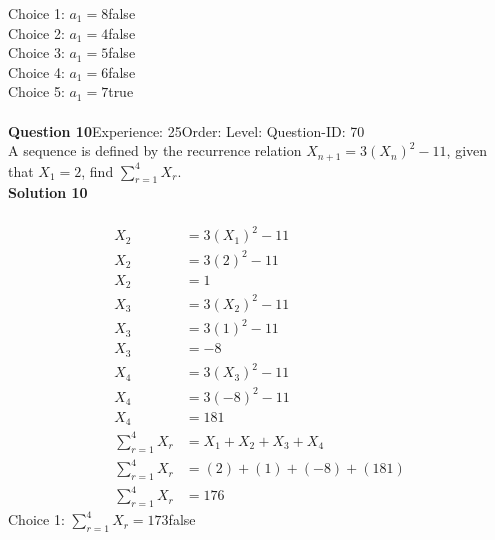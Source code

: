 \documentclass{article}
\begin{document}
Choice 1: \hspace{20pt}$a_1=8$\hspace{20pt}false\\
Choice 2: \hspace{20pt}$a_1=4$\hspace{20pt}false\\
Choice 3: \hspace{20pt}$a_1=5$\hspace{20pt}false\\
Choice 4: \hspace{20pt}$a_1=6$\hspace{20pt}false\\
Choice 5: \hspace{20pt}$a_1=7$\hspace{20pt}true\\
\\[4pt]
\noindent\textbf{Question 10}\hspace{20pt}Experience: 25\hspace{20pt}Order: \hspace{20pt}Level: \hspace{20pt}Question-ID: 70\\[2pt]
A sequence is defined by the recurrence relation $X_{n+1}=3(X_n)^2-11$, given that  $X_1 =2$, find $\displaystyle\sum_{r=1}^{4} X_r$.\\[4pt]
\noindent\textbf{Solution 10}\\[2pt]
\\[-35pt]\begin{align*}
X_2&=3(X_1)^2-11\\[2pt]
X_2&=3(2)^2-11\\[2pt]
X_2&=1\\[12pt]
X_3&=3(X_2)^2-11\\[2pt]
X_3&=3(1)^2-11\\[2pt]
X_3&=-8\\[12pt]
X_4&=3(X_3)^2-11\\[2pt]
X_4&=3(-8)^2-11\\[2pt]
X_4&=181\\[12pt]
\displaystyle\sum_{r=1}^{4} X_r&=X_1+X_2+X_3+X_4\\[2pt]
\displaystyle\sum_{r=1}^{4} X_r&=(2)+(1)+(-8)+(181)\\[2pt]
\displaystyle\sum_{r=1}^{4} X_r&=176
\end{align*}
Choice 1: \hspace{20pt}$\displaystyle\sum_{r=1}^{4} X_r=173$\hspace{20pt}false\\
\end{document}
